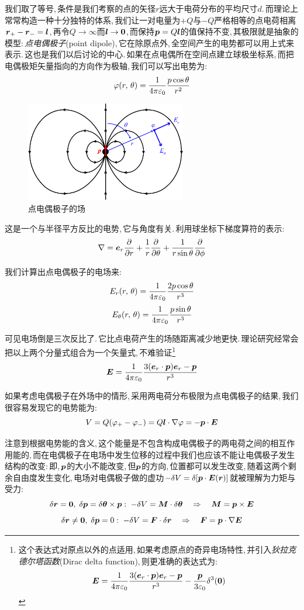 我们取了等号,\,条件是我们考察的点的矢径$r$远大于电荷分布的平均尺寸$d$.\,而理论上常常构造一种十分独特的体系,\,我们让一对电量为$+Q$与$-Q$严格相等的点电荷相离$\boldsymbol{r}_+-\boldsymbol{r}_-=\boldsymbol{l}$,\,再令$Q\to\infty$而$\boldsymbol{l}\to \boldsymbol{0}$,\,而保持$\boldsymbol{p}=Q\boldsymbol{l}$的值保持不变,\,其极限就是抽象的模型:\,\emph{点电偶极子}(point dipole),\,它在除原点外,\,全空间产生的电势都可以用上式来表示.\,这也是我们以后讨论的中心.\,如果在点电偶所在空间点建立球极坐标系,\,而把电偶极矩矢量指向的方向作为极轴,\,我们可以写出电势为:
\[\varphi(r,\,\theta)=\frac{1}{4\pi\varepsilon_0}\frac{p\cos\theta}{r^2}\]
\begin{figure}
\centering
\vspace{-0.5cm}
\includegraphics[width=7cm]{image/7-1-13.png}
\caption{点电偶极子的场}
\end{figure}
这是一个与半径平方反比的电势,\,它与角度有关.\,利用球坐标下梯度算符的表示:
\[\nabla=\boldsymbol{e}_r \frac{\partial}{\partial r} +\frac{1}{r}\frac{\partial}{\partial \theta}+\frac{1}{r\sin\theta}\frac{\partial}{\partial \phi}\]

我们计算出点电偶极子的电场来:
\[E_r(r,\,\theta)=\frac{1}{4\pi\varepsilon_0}\frac{2p\cos\theta}{r^3}\]
\[E_\theta(r,\,\theta)=\frac{1}{4\pi\varepsilon_0}\frac{p\sin\theta}{r^3}\]

可见电场倒是三次反比了.\,它比点电荷产生的场随距离减少地更快.\,理论研究经常会把以上两个分量式组合为一个矢量式,\,不难验证\footnote{这个表达式对原点以外的点适用,\,如果考虑原点的奇异电场特性,\,并引入\emph{狄拉克德尔塔函数}(Dirac delta function),\,则更准确的表达式为:
\[\boldsymbol{E}=\frac{1}{4\pi\varepsilon_0} \frac{3(\boldsymbol{e}_r\cdot\boldsymbol{p})\boldsymbol{e}_r-\boldsymbol{p}}{r^3}-\frac{\boldsymbol{p}}{3\varepsilon_0}\delta^3(\boldsymbol{0})\]}
\[\boldsymbol{E}=\frac{1}{4\pi\varepsilon_0} \frac{3(\boldsymbol{e}_r\cdot\boldsymbol{p})\boldsymbol{e}_r-\boldsymbol{p}}{r^3}\]

如果考虑电偶极子在外场中的情形,\,采用两电荷分布极限为点电偶极子的结果,\,我们很容易发现它的电势能为:
\[V=Q(\varphi_+-\varphi_-)=Q\boldsymbol{l}\cdot\nabla\varphi=-\boldsymbol{p}\cdot\boldsymbol{E}\]

注意到根据电势能的含义,\,这个能量是不包含构成电偶极子的两电荷之间的相互作用能的,\,而在电偶极子在电场中发生位移的过程中我们也应该不能让电偶极子发生结构的改变:\,即,\,$\boldsymbol{p}$的大小不能改变,\,但$\boldsymbol{p}$的方向,\,位置都可以发生改变,\,随着这两个剩余自由度发生变化,\,电场对电偶极子做的虚功$-\delta V=\delta[\boldsymbol{p}\cdot\boldsymbol{E}(\boldsymbol{r})]$就被理解为力矩与受力:
\[\delta \boldsymbol{r}=\boldsymbol{0},\;\delta \boldsymbol{p}=\delta \boldsymbol{\theta}\times \boldsymbol{p}:\; -\delta V=\boldsymbol{M}\cdot \delta\boldsymbol{\theta}\quad \Rightarrow \quad \boldsymbol{M}=\boldsymbol{p}\times\boldsymbol{E}\]
\[\delta \boldsymbol{r}\neq\boldsymbol{0},\;\delta \boldsymbol{p}=0:\; -\delta V=\boldsymbol{F}\cdot \delta\boldsymbol{r}\quad \Rightarrow \quad \boldsymbol{F}=\boldsymbol{p}\cdot\nabla\boldsymbol{E}\]


